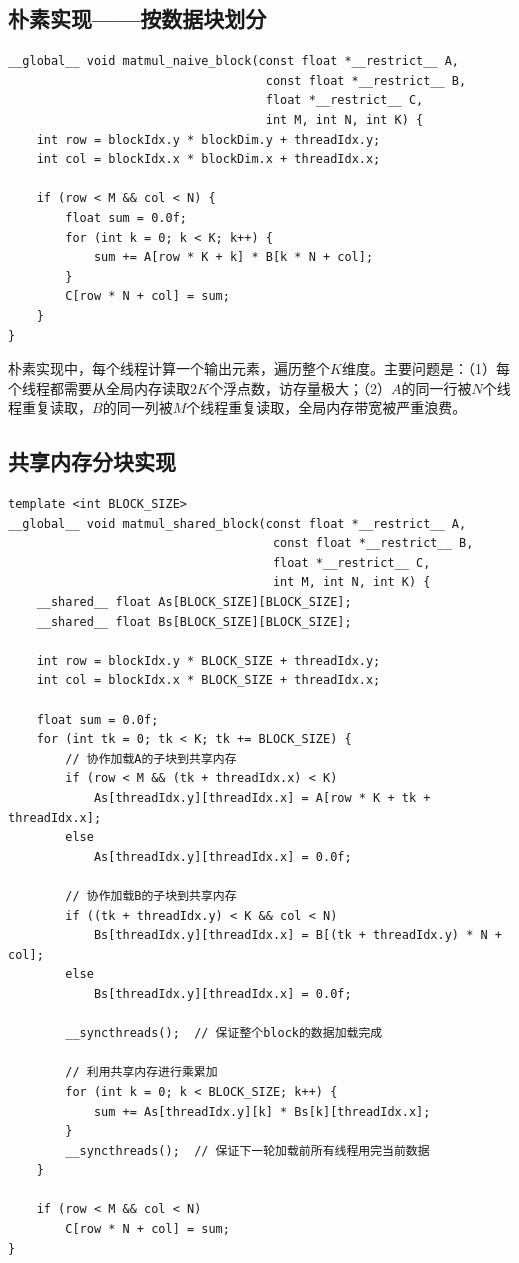 \documentclass{SYSUReport}
\begin{document}
\subsection{朴素实现——按数据块划分}

\begin{lstlisting}[style=cuda_cpp, caption={朴素矩阵乘法（全局内存，2D Grid + 2D Block）}, label={lst:naive}]
__global__ void matmul_naive_block(const float *__restrict__ A,
                                    const float *__restrict__ B,
                                    float *__restrict__ C,
                                    int M, int N, int K) {
    int row = blockIdx.y * blockDim.y + threadIdx.y;
    int col = blockIdx.x * blockDim.x + threadIdx.x;

    if (row < M && col < N) {
        float sum = 0.0f;
        for (int k = 0; k < K; k++) {
            sum += A[row * K + k] * B[k * N + col];
        }
        C[row * N + col] = sum;
    }
}
\end{lstlisting}

朴素实现中，每个线程计算一个输出元素，遍历整个$K$维度。主要问题是：（1）每个线程都需要从全局内存读取$2K$个浮点数，访存量极大；（2）$A$的同一行被$N$个线程重复读取，$B$的同一列被$M$个线程重复读取，全局内存带宽被严重浪费。

\subsection{共享内存分块实现}

\begin{lstlisting}[style=cuda_cpp, caption={共享内存分块矩阵乘法}, label={lst:shared}]
template <int BLOCK_SIZE>
__global__ void matmul_shared_block(const float *__restrict__ A,
                                     const float *__restrict__ B,
                                     float *__restrict__ C,
                                     int M, int N, int K) {
    __shared__ float As[BLOCK_SIZE][BLOCK_SIZE];
    __shared__ float Bs[BLOCK_SIZE][BLOCK_SIZE];

    int row = blockIdx.y * BLOCK_SIZE + threadIdx.y;
    int col = blockIdx.x * BLOCK_SIZE + threadIdx.x;

    float sum = 0.0f;
    for (int tk = 0; tk < K; tk += BLOCK_SIZE) {
        // 协作加载A的子块到共享内存
        if (row < M && (tk + threadIdx.x) < K)
            As[threadIdx.y][threadIdx.x] = A[row * K + tk + threadIdx.x];
        else
            As[threadIdx.y][threadIdx.x] = 0.0f;

        // 协作加载B的子块到共享内存
        if ((tk + threadIdx.y) < K && col < N)
            Bs[threadIdx.y][threadIdx.x] = B[(tk + threadIdx.y) * N + col];
        else
            Bs[threadIdx.y][threadIdx.x] = 0.0f;

        __syncthreads();  // 保证整个block的数据加载完成

        // 利用共享内存进行乘累加
        for (int k = 0; k < BLOCK_SIZE; k++) {
            sum += As[threadIdx.y][k] * Bs[k][threadIdx.x];
        }
        __syncthreads();  // 保证下一轮加载前所有线程用完当前数据
    }

    if (row < M && col < N)
        C[row * N + col] = sum;
}
\end{lstlisting}
\end{document}
